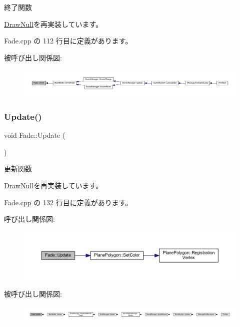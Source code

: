 終了関数 



\mbox{\hyperlink{class_draw_null_a12d44e341c7364b5ab9cdd661dc16187}{Draw\+Null}}を再実装しています。



 Fade.\+cpp の 112 行目に定義があります。

被呼び出し関係図\+:
\nopagebreak
\begin{figure}[H]
\begin{center}
\leavevmode
\includegraphics[width=350pt]{class_fade_ae77d06811869d3c8162a42c3e0e14f7f_icgraph}
\end{center}
\end{figure}
\mbox{\label{class_fade_a1579b5b9020344a1131ea11c15f2c0bd}} 
\subsubsection{\texorpdfstring{Update()}{Update()}}
{\footnotesize\ttfamily void Fade\+::\+Update (\begin{DoxyParamCaption}{ }\end{DoxyParamCaption})\hspace{0.3cm}{\ttfamily [virtual]}}



更新関数 



\mbox{\hyperlink{class_draw_null_a0149bcf84a34b138642ab7975ae46f30}{Draw\+Null}}を再実装しています。



 Fade.\+cpp の 132 行目に定義があります。

呼び出し関係図\+:\nopagebreak
\begin{figure}[H]
\begin{center}
\leavevmode
\includegraphics[width=350pt]{class_fade_a1579b5b9020344a1131ea11c15f2c0bd_cgraph}
\end{center}
\end{figure}
被呼び出し関係図\+:
\nopagebreak
\begin{figure}[H]
\begin{center}
\leavevmode
\includegraphics[width=350pt]{class_fade_a1579b5b9020344a1131ea11c15f2c0bd_icgraph}
\end{center}
\end{figure}


